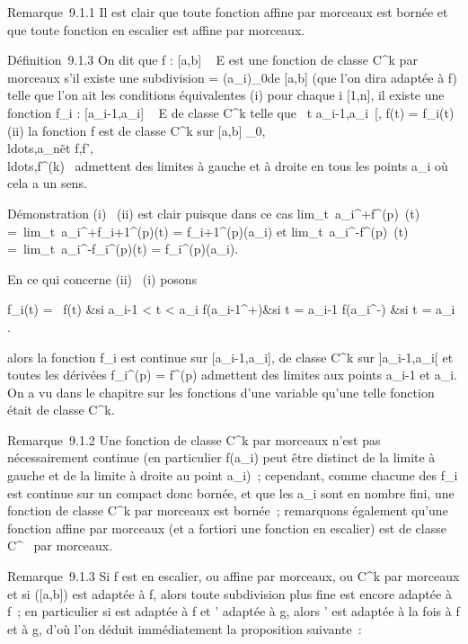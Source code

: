 \documentclass[]{article}
\begin{document}
Remarque~9.1.1 Il est clair que toute fonction affine par morceaux est
bornée et que toute fonction en escalier est affine par morceaux.

Définition~9.1.3 On dit que f : {[}a,b{]} \rightarrow~ E est une fonction de classe
C^k par morceaux s'il existe une subdivision \sigma =
(a\_i)\_0\leqi\leqn de {[}a,b{]} (que l'on dira adaptée à f)
telle que l'on ait les conditions équivalentes (i) pour chaque i \in
{[}1,n{]}, il existe une fonction f\_i :
{[}a\_i-1,a\_i{]} \rightarrow~ E de classe C^k telle que
\forall~t \in{]}a\_i-1,a\_i~{[}, f(t) =
f\_i(t) (ii) la fonction f est de classe C^k sur
{[}a,b{]}
\diagdown\a\_0,\\ldots,a\_n\~
et
f,f',\\ldots,f^(k)~
admettent des limites à gauche et à droite en tous les points
a\_i où cela a un sens.

Démonstration (i) \rigtharrow~(ii) est clair puisque dans ce cas
lim\_t\rightarrow~a\_i^+f^(p)~(t)
=\
lim\_t\rightarrow~a\_i^+f\_i+1^(p)(t) =
f\_i+1^(p)(a\_i) et
lim\_t\rightarrow~a\_i^-f^(p)~(t)
=\
lim\_t\rightarrow~a\_i^-f\_i^(p)(t) =
f\_i^(p)(a\_i).

En ce qui concerne (ii) \rigtharrow~(i) posons

 f\_i(t) = \left \
\cases f(t) &si a\_i-1 \textless{} t
\textless{} a\_i \cr
f(a\_i-1^+)&si t = a\_i-1 \cr
f(a\_i^-) &si t = a\_i  \right
.

alors la fonction f\_i est continue sur
{[}a\_i-1,a\_i{]}, de classe C^k sur
{]}a\_i-1,a\_i{[} et toutes les dérivées
f\_i^(p) = f^(p) admettent des limites aux
points a\_i-1 et a\_i. On a vu dans le chapitre sur les
fonctions d'une variable qu'une telle fonction était de classe
C^k.

Remarque~9.1.2 Une fonction de classe C^k par morceaux n'est
pas nécessairement continue (en particulier f(a\_i) peut être
distinct de la limite à gauche et de la limite à droite au point
a\_i)~; cependant, comme chacune des f\_i est continue
sur un compact donc bornée, et que les a\_i sont en nombre fini,
une fonction de classe C^k par morceaux est bornée~;
remarquons également qu'une fonction affine par morceaux (et a fortiori
une fonction en escalier) est de classe C^\infty~ par morceaux.

Remarque~9.1.3 Si f est en escalier, ou affine par morceaux, ou
C^k par morceaux et si \sigma \inS({[}a,b{]}) est adaptée à f, alors
toute subdivision plus fine est encore adaptée à f~; en particulier si \sigma
est adaptée à f et \sigma' adaptée à g, alors \sigma \cup \sigma' est adaptée à la fois à
f et à g, d'où l'on déduit immédiatement la proposition suivante~:
\end{document}
